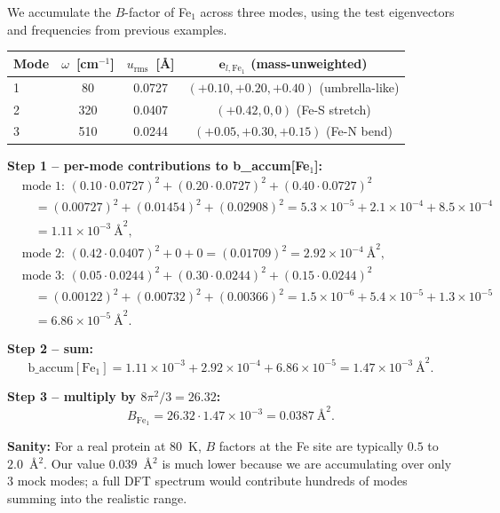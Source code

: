 \documentclass[10pt,a4paper,twoside]{article}
\newcommand{\evec}{\mathbf{e}}
\newcommand{\urms}{u_{\mathrm{rms}}}
\begin{document}
\begin{workedexample}
We accumulate the $B$-factor of Fe$_1$ across three modes, using
the test eigenvectors and frequencies from previous examples.
\begin{center}
\begin{tabular}{lccc}
\toprule
Mode & $\omega$~[cm$^{-1}$] & $\urms$~[\AA{}]
                            & $\evec_{l,\text{Fe}_1}$ (mass-unweighted) \\
\midrule
1 & 80    & 0.0727 & $(+0.10, +0.20, +0.40)$ (umbrella-like) \\
2 & 320   & 0.0407 & $(+0.42, 0,     0)$     (Fe-S stretch) \\
3 & 510   & 0.0244 & $(+0.05, +0.30, +0.15)$ (Fe-N bend) \\
\bottomrule
\end{tabular}
\end{center}

\textbf{Step 1 -- per-mode contributions to b\_accum[Fe$_1$]:}
\begin{align*}
  &\text{mode 1: } (0.10 \cdot 0.0727)^2 + (0.20 \cdot 0.0727)^2 + (0.40 \cdot 0.0727)^2 \\
  &\quad = (0.00727)^2 + (0.01454)^2 + (0.02908)^2
  = 5.3 \times 10^{-5} + 2.1 \times 10^{-4} + 8.5 \times 10^{-4} \\
  &\quad = 1.11 \times 10^{-3}~\text{\AA{}}^2, \\[4pt]
  &\text{mode 2: } (0.42 \cdot 0.0407)^2 + 0 + 0
  = (0.01709)^2 = 2.92 \times 10^{-4}~\text{\AA{}}^2, \\[4pt]
  &\text{mode 3: } (0.05 \cdot 0.0244)^2 + (0.30 \cdot 0.0244)^2 + (0.15 \cdot 0.0244)^2 \\
  &\quad = (0.00122)^2 + (0.00732)^2 + (0.00366)^2
  = 1.5 \times 10^{-6} + 5.4 \times 10^{-5} + 1.3 \times 10^{-5} \\
  &\quad = 6.86 \times 10^{-5}~\text{\AA{}}^2.
\end{align*}

\textbf{Step 2 -- sum:}
\[
  \text{b\_accum}[\text{Fe}_1] = 1.11 \times 10^{-3}
                              + 2.92 \times 10^{-4}
                              + 6.86 \times 10^{-5}
   = 1.47 \times 10^{-3}~\text{\AA{}}^2.
\]

\textbf{Step 3 -- multiply by $8\pi^2/3 = 26.32$:}
\[
  B_{\text{Fe}_1} = 26.32 \cdot 1.47 \times 10^{-3}
   = \boxed{0.0387~\text{\AA{}}^2}.
\]

\textbf{Sanity:} For a real protein at 80~K, $B$ factors at the
Fe site are typically $0.5$ to $2.0$~\AA{}$^2$. Our value
$0.039$~\AA{}$^2$ is much lower because we are accumulating over
only 3 mock modes; a full DFT spectrum would contribute hundreds
of modes summing into the realistic range.


\end{workedexample}
\end{document}
